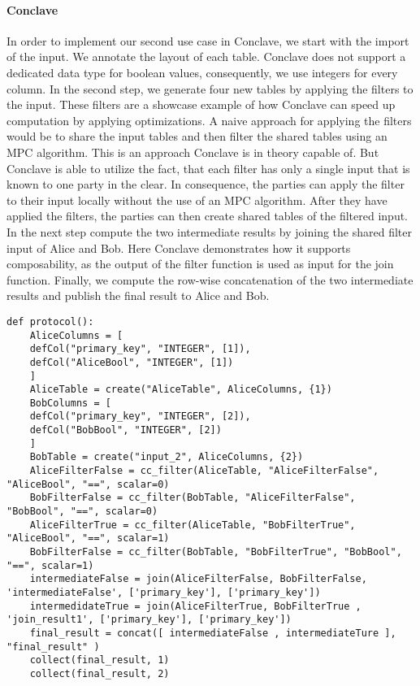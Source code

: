 \paragraph{Conclave}
In order to implement our second use case in Conclave, we start with the import of the input. We annotate the layout of each table. Conclave does not support a dedicated data type for boolean values, consequently, we use integers for every column. In the second step, we generate four new tables by applying the filters to the input. These filters are a showcase example of how Conclave can speed up computation by applying optimizations.
A naive approach for applying the filters would be to share the input tables and then filter the shared tables using an MPC algorithm. This is an approach Conclave is in theory capable of. But Conclave is able to utilize the fact, that each filter has only a single input that is known to one party in the clear. In consequence, the parties can apply the filter to their input locally without the use of an MPC algorithm. After they have applied the filters, the parties can then create shared tables of the filtered input. In the next step compute the two intermediate results by joining the shared filter input of Alice and Bob. Here Conclave demonstrates how it supports composability, as the output of the filter function is used as input for the join function.  
Finally, we compute the row-wise concatenation of the two intermediate results and publish the final result to Alice and Bob.   
\begin{lstlisting}[caption={Simpifiyed Protocol for our second use case in Conclave}]
def protocol():
	AliceColumns = [
	defCol("primary_key", "INTEGER", [1]),
	defCol("AliceBool", "INTEGER", [1])
	]
	AliceTable = create("AliceTable", AliceColumns, {1})
	BobColumns = [
	defCol("primary_key", "INTEGER", [2]),
	defCol("BobBool", "INTEGER", [2])
	]
	BobTable = create("input_2", AliceColumns, {2})
	AliceFilterFalse = cc_filter(AliceTable, "AliceFilterFalse", "AliceBool", "==", scalar=0)
	BobFilterFalse = cc_filter(BobTable, "AliceFilterFalse", "BobBool", "==", scalar=0)
	AliceFilterTrue = cc_filter(AliceTable, "BobFilterTrue", "AliceBool", "==", scalar=1)
	BobFilterFalse = cc_filter(BobTable, "BobFilterTrue", "BobBool", "==", scalar=1)
	intermediateFalse = join(AliceFilterFalse, BobFilterFalse, 'intermediateFalse', ['primary_key'], ['primary_key'])
	intermedidateTrue = join(AliceFilterTrue, BobFilterTrue , 'join_result1', ['primary_key'], ['primary_key'])
	final_result = concat([ intermediateFalse , intermediateTure ], "final_result" )
	collect(final_result, 1)
	collect(final_result, 2)
\end{lstlisting}



